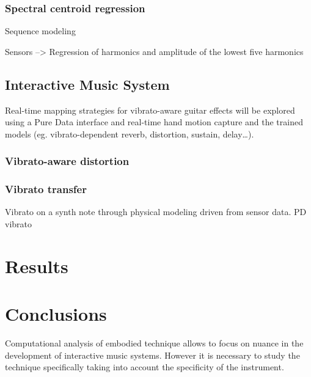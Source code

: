 \documentclass{nime-alternate} %
\begin{document}
\subsubsection{Spectral centroid regression}
Sequence modeling 

Sensors --> Regression of harmonics and amplitude of the lowest five harmonics


\subsection{Interactive Music System}
Real-time mapping strategies for vibrato-aware guitar effects will be explored using a Pure Data interface and real-time hand motion capture and the trained models (eg. vibrato-dependent reverb, distortion, sustain, delay…).
\subsubsection{Vibrato-aware distortion}
\subsubsection{Vibrato transfer}
Vibrato on a synth note through physical modeling driven from sensor data.
PD vibrato


\section{Results}




\section{Conclusions}
Computational analysis of embodied technique allows to focus on nuance in the development of interactive music systems. However it is necessary to study the technique specifically taking into account the specificity of the instrument. 


%


	 
\end{document}

